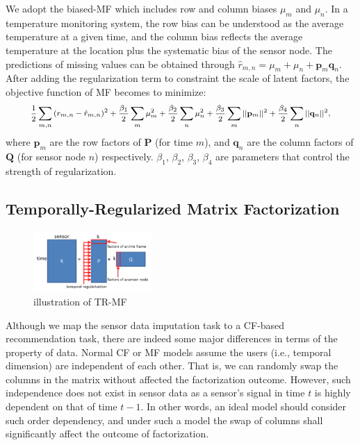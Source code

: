 We adopt the biased-MF which includes row and column biases $\mu_m$ and $\mu_n$. %
In a temperature monitoring system, the row bias can be understood as the average temperature at a given time, and the column bias reflects the average temperature at the location plus the systematic bias of the sensor node.
The predictions of missing values can be obtained through $\hat{r}_{m,n} = \mu_m + \mu_n + \mathbf{p}_m \mathbf{q}_n$.
After adding the regularization term to constraint the scale of latent factors, the objective function of MF becomes to minimize:
\begin{equation*}\small \begin{aligned}
\frac{1}{2}\sum_{m,n}{(r_{m,n} - \hat{r}_{m,n})}^2 + \frac{\beta_1}{2}\sum_m{\mu_m^2} + \frac{\beta_2}{2}\sum_n{\mu_n^2}
 + \frac{\beta_3}{2}\sum_m{||\mathbf{p}_m||^2} + \frac{\beta_4}{2}\sum_n{||\mathbf{q}_n||^2},
\end{aligned}\end{equation*}
where $\mathbf{p}_m$ are the row factors of $\mathbf{P}$ (for time $m$), and $\mathbf{q}_n$ are the column factors of $\mathbf{Q}$ (for sensor node $n$) respectively.
$\beta_1$, $\beta_2$, $\beta_3$, $\beta_4$ are parameters that control the strength of regularization.

\subsection{Temporally-Regularized Matrix Factorization}
\begin{figure}[htbp]
	\centering
	\includegraphics[width=0.4\textwidth]{TRMF_illustration.png}
	\caption{illustration of TR-MF}
\end{figure}
Although we map the sensor data imputation task to a CF-based recommendation task, there are indeed some major differences in terms of the property of data.
Normal CF or MF models assume the users (i.e., temporal dimension) are independent of each other. That is, we can randomly swap the columns in the matrix without affected the factorization outcome. However, such independence does not exist in sensor data as a 
sensor's signal in time $t$ is highly dependent on that of time $t-1$. In other words, an ideal model should consider such order dependency, and under such a model the swap of columns shall significantly affect the outcome of factorization.

